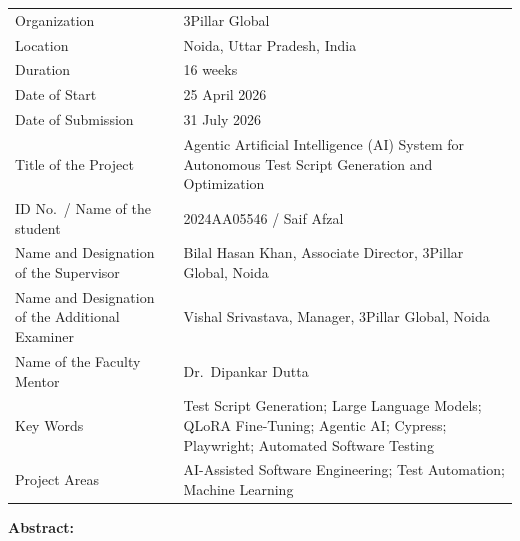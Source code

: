 \vspace{-3em}
\begin{singlespace}
\small
\setlength{\LTpre}{4pt}
\setlength{\LTpost}{4pt}

\begin{longtable}[]{@{}p{}p{}@{}}
\toprule
\endhead
Organization & 3Pillar Global \\
Location & Noida, Uttar Pradesh, India \\
Duration & 16 weeks \\
Date of Start & 25 April 2026 \\
Date of Submission & 31 July 2026 \\
Title of the Project & Agentic Artificial Intelligence (AI) System for
Autonomous Test Script Generation and Optimization \\
ID No.~/ Name of the student & 2024AA05546 / Saif Afzal \\
Name and Designation of the Supervisor & Bilal Hasan Khan, Associate
Director, 3Pillar Global, Noida \\
Name and Designation of the Additional Examiner & Vishal Srivastava,
Manager, 3Pillar Global, Noida \\
Name of the Faculty Mentor & Dr.~Dipankar Dutta \\
Key Words & Test Script Generation; Large Language Models; QLoRA
Fine-Tuning; Agentic AI; Cypress; Playwright; Automated Software
Testing \\
Project Areas & AI-Assisted Software Engineering; Test Automation;
Machine Learning \\
\bottomrule
\end{longtable}

\textbf{Abstract:}


\end{singlespace}
